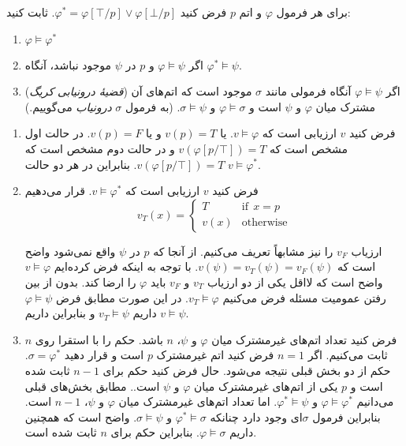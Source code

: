 برای هر فرمول $\varphi$ و اتم $p$ فرض کنید
$\varphi^*=\varphi[\top/p]\vee \varphi[\bot/p]$.
ثابت کنید:
\begin{enumerate}
\item
$\varphi\models \varphi^*$
\item
اگر
$\varphi\models \psi$
و $p$ در $\psi$ موجود نباشد، آنگاه
$\varphi^*\models \psi$.
\item
(\emph{قضیهٔ درونیابی کریگ})
اگر
$\varphi\models \psi$
آنگاه فرمولی مانند $\sigma$ موجود است که اتم‌های آن مشترک میان $\varphi$ و $\psi$ است و $\varphi\models \sigma$ و $\sigma\models \psi$.
(به فرمول $\sigma$ \emph{درونیاب} می‌گوییم.)%

\end{enumerate}\quad\vspace{-1cm}
\begin{ans}
  \begin{enumerate}
  \item
  فرض کنید $v$ ارزیابی است که $v\models \varphi$. یا $v(p)=T$ و یا $v(p)=F$. در حالت اول مشخص است که
  $v(\varphi[p/\top])=T$
  و در حالت دوم مشخص است که
  $v(\varphi[p/\top])=T$.
  بنابراین در هر دو حالت
  $v\models \varphi^*$.

  \item
  فرض کنید $v$ ارزیابی است که $v\models \varphi^*$. قرار می‌دهیم
  $$
  v_T(x)=
  \begin{cases}
  T & \text{if}~~x=p\\
  v(x) & \text{otherwise}
  \end{cases}
  $$

  ارزیاب $v_F$ را نیز مشابهاً تعریف می‌کنیم. از آنجا که $p$ در $\psi$ واقع نمی‌شود واضح است که $v(\psi)=v_T(\psi)=v_F(\psi)$. با توجه به اینکه فرض کرده‌ایم $v\models \varphi$ واضح است که لااقل یکی از دو ارزیاب $v_T$ و $v_F$ باید $\varphi$ را ارضا کند. بدون از بین رفتن عمومیت مسئله فرض می‌کنیم $v_T\models \varphi$. در این صورت مطابق فرض $\varphi\models \psi$ داریم $v_T\models \psi$ و بنابراین داریم $v\models \psi$.

  \item
  فرض کنید تعداد اتم‌های غیرمشترک میان $\varphi$ و $\psi$، $n$ باشد. حکم را با استقرا روی $n$ ثابت می‌کنیم. اگر $n=1$ فرض کنید اتم غیرمشترک $p$ است و قرار دهید $\sigma=\varphi^*$. حکم از دو بخش قبلی نتیجه می‌شود. حال فرض کنید حکم برای $n-1$ ثابت شده است و $p$ یکی از اتم‌های غیرمشترک میان $\varphi$ و $\psi$ است.. مطابق بخش‌های قبلی می‌دانیم $\varphi\models \varphi^*$ و $\varphi^*\models \psi$. اما تعداد اتم‌های غیرمشترک میان $\varphi$ و $\psi$، $n-1$ است. بنابراین فرمول $\sigma$ای وجود دارد چنانکه $\varphi^*\models \sigma$ و $\sigma\models \psi$. واضح است که همچنین داریم $\varphi\models \sigma$. بنابراین حکم برای $n$ ثابت شده است.
  \end{enumerate}
\end{ans}